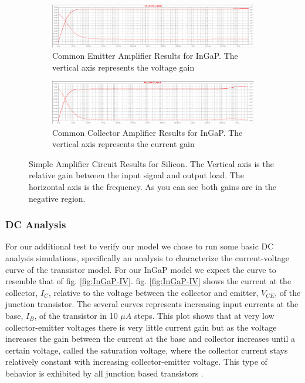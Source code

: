 \documentclass[conference]{IEEEtran}
\begin{document}
\begin{figure}[htbp]
    \centering
    \begin{subfigure}[b]{\textwidth}
        \centerline{\includegraphics[width=\textwidth]{figures/InGaP-Result-CE.png}}
        \caption{Common Emitter Amplifier Results for InGaP. The vertical axis represents the voltage gain}
        \label{fig:InGaP-Result-CE}
    \end{subfigure}
    \par\bigskip
    \begin{subfigure}[b]{\textwidth}
        \centerline{\includegraphics[width=\textwidth]{figures/InGaP-Result-CC.png}}
        \caption{Common Collector Amplifier Results for InGaP. The vertical axis represents the current gain}
        \label{fig:InGaP-Result-CC}
    \end{subfigure}
    \caption{Simple Amplifier Circuit Results for Silicon. The Vertical axis is the relative gain between the input signal and output load.
        The horizontal axis is the frequency. As you can see both gains are in the negative region.}
\end{figure}

\subsubsection{DC Analysis}

For our additional test to verify our model we chose to run some basic DC analysis simulations, specifically an analysis to characterize the
current-voltage curve of the transistor model. For our InGaP model we expect the curve to resemble that of fig. \ref{fig:InGaP-IV}. fig.
\ref{fig:InGaP-IV} shows the current at the collector, $I_C$, relative to the voltage between the collector and emitter, $V_{CE}$, of the
junction transistor. The several curves represents increasing input currents at the base, $I_B$, of the transistor in 10 $\mu A$ steps. This plot
shows that at very low collector-emitter voltages there is very little current gain but as the voltage increases the gain between the current
at the base and collector increases until a certain voltage, called the saturation voltage, where the collector current stays relatively constant
with increasing collector-emitter voltage. This type of behavior is exhibited by all junction based transistors \cite{sze_physics_2007}.
\end{document}
